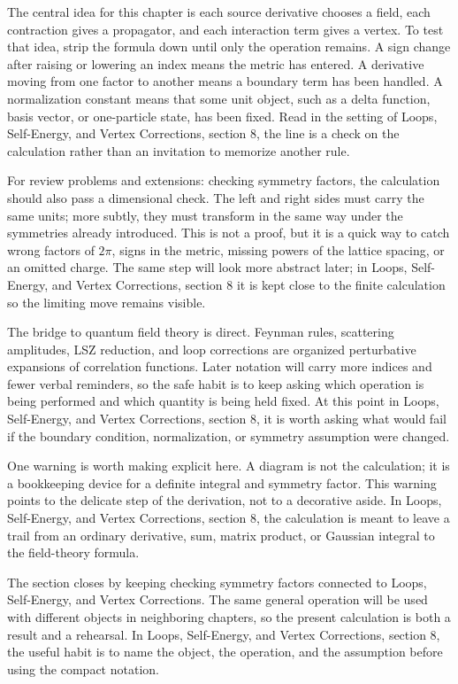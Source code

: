 The central idea for this chapter is each source derivative chooses a field, each contraction gives a propagator, and each interaction term gives a vertex.  To test that idea, strip the formula down until only the operation remains.  A sign change after raising or lowering an index means the metric has entered.  A derivative moving from one factor to another means a boundary term has been handled.  A normalization constant means that some unit object, such as a delta function, basis vector, or one-particle state, has been fixed.  Read in the setting of Loops, Self-Energy, and Vertex Corrections, section 8, the line is a check on the calculation rather than an invitation to memorize another rule.

For review problems and extensions: checking symmetry factors, the calculation should also pass a dimensional check.  The left and right sides must carry the same units; more subtly, they must transform in the same way under the symmetries already introduced.  This is not a proof, but it is a quick way to catch wrong factors of \(2\pi\), signs in the metric, missing powers of the lattice spacing, or an omitted charge.  The same step will look more abstract later; in Loops, Self-Energy, and Vertex Corrections, section 8 it is kept close to the finite calculation so the limiting move remains visible.

The bridge to quantum field theory is direct.  Feynman rules, scattering amplitudes, LSZ reduction, and loop corrections are organized perturbative expansions of correlation functions.  Later notation will carry more indices and fewer verbal reminders, so the safe habit is to keep asking which operation is being performed and which quantity is being held fixed.  At this point in Loops, Self-Energy, and Vertex Corrections, section 8, it is worth asking what would fail if the boundary condition, normalization, or symmetry assumption were changed.

One warning is worth making explicit here.  A diagram is not the calculation; it is a bookkeeping device for a definite integral and symmetry factor.  This warning points to the delicate step of the derivation, not to a decorative aside.  In Loops, Self-Energy, and Vertex Corrections, section 8, the calculation is meant to leave a trail from an ordinary derivative, sum, matrix product, or Gaussian integral to the field-theory formula.

The section closes by keeping checking symmetry factors connected to Loops, Self-Energy, and Vertex Corrections.  The same general operation will be used with different objects in neighboring chapters, so the present calculation is both a result and a rehearsal.  In Loops, Self-Energy, and Vertex Corrections, section 8, the useful habit is to name the object, the operation, and the assumption before using the compact notation.



